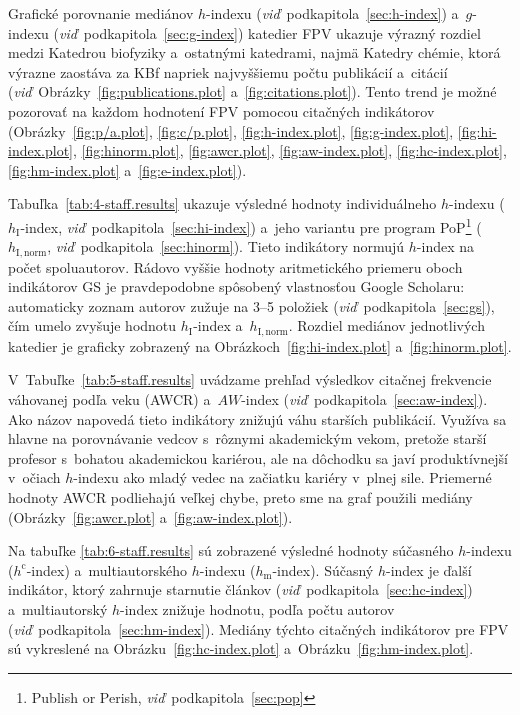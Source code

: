 Grafické porovnanie mediánov $h$-indexu
(\emph{viď}~podkapitola~\ref{sec:h-index}) a~$g$-indexu
(\emph{viď}~podkapitola~\ref{sec:g-index}) katedier FPV ukazuje výrazný rozdiel
medzi Katedrou biofyziky a~ostatnými katedrami, najmä Katedry chémie, ktorá
výrazne zaostáva za KBf napriek najvyššiemu počtu publikácií a~citácií
(\emph{viď}~Obrázky~\ref{fig:publications.plot} a~\ref{fig:citations.plot}).
Tento trend je možné pozorovať na každom hodnotení FPV pomocou citačných
indikátorov (Obrázky~\ref{fig:p/a.plot}, \ref{fig:c/p.plot},
\ref{fig:h-index.plot}, \ref{fig:g-index.plot}, \ref{fig:hi-index.plot},
\ref{fig:hinorm.plot}, \ref{fig:awcr.plot}, \ref{fig:aw-index.plot},
\ref{fig:hc-index.plot}, \ref{fig:hm-index.plot} a~\ref{fig:e-index.plot}).

Tabuľka~\ref{tab:4-staff.results} ukazuje výsledné hodnoty individuálneho
$h$-indexu ($h_{\mathrm{I}}$-index, \emph{viď}~podkapitola~\ref{sec:hi-index})
a~jeho variantu pre program PoP\footnote{Publish or Perish,
  \emph{viď}~podkapitola~\ref{sec:pop}} ($h_{\mathrm{I,norm}}$,
\emph{viď}~podkapitola~\ref{sec:hinorm}).  Tieto indikátory normujú $h$-index na
počet spoluautorov.  Rádovo vyššie hodnoty aritmetického priemeru oboch
indikátorov GS je pravdepodobne spôsobený vlastnosťou Google Scholaru:
automaticky zoznam autorov zužuje na 3--5 položiek
(\emph{viď}~podkapitola~\ref{sec:gs}), čím umelo zvyšuje hodnotu
$h_{\mathrm{I}}$-index a~$h_{\mathrm{I,norm}}$.  Rozdiel mediánov jednotlivých
katedier je graficky zobrazený na Obrázkoch~\ref{fig:hi-index.plot}
a~\ref{fig:hinorm.plot}.

V~Tabuľke~\ref{tab:5-staff.results} uvádzame prehľad výsledkov citačnej
frekvencie váhovanej podľa veku (AWCR) a~$AW$-index
(\emph{viď}~podkapitola~\ref{sec:aw-index}).  Ako názov napovedá tieto
indikátory znižujú váhu starších publikácií.  Využíva sa hlavne na porovnávanie
vedcov s~rôznymi akademickým vekom, pretože starší profesor s~bohatou
akademickou kariérou, ale na dôchodku sa javí produktívnejší v~očiach $h$-indexu
ako mladý vedec na začiatku kariéry v~plnej sile.  Priemerné hodnoty AWCR
podliehajú veľkej chybe, preto sme na graf použili mediány
(Obrázky~\ref{fig:awcr.plot} a~\ref{fig:aw-index.plot}).

Na tabuľke \ref{tab:6-staff.results} sú zobrazené výsledné hodnoty súčasného
$h$-indexu ($h^{\mathrm{c}}$-index) a~multiautorského $h$-indexu
($h_{\mathrm{m}}$-index).  Súčasný $h$-index je ďalší indikátor, ktorý zahrnuje
starnutie článkov (\emph{viď}~podkapitola~\ref{sec:hc-index}) a~multiautorský
$h$-index znižuje hodnotu, podľa počtu autorov
(\emph{viď}~podkapitola~\ref{sec:hm-index}).  Mediány týchto citačných
indikátorov pre FPV sú vykreslené na Obrázku~\ref{fig:hc-index.plot}
a~Obrázku~\ref{fig:hm-index.plot}.

